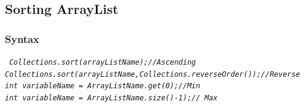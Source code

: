 \documentclass[openany]{book}  %
\begin{document}
\newpage

% 
% 
\subsection{Sorting ArrayList}
% 
% 
\subsubsection{Syntax}
\begin{center}
    \tt{
        \textit{Collections.sort(arrayListName);//Ascending\\Collections.sort(arrayListName,Collections.reverseOrder());//Reverse\\int variableName = ArrayListName.get(0);//Min\\int variableName = ArrayListName.size()-1);// Max}
    }
\end{center}
% 
% 
\end{document}
